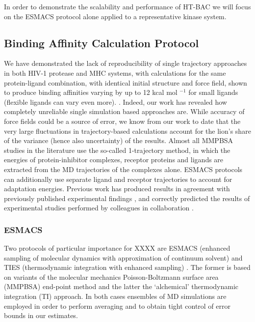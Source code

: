 In order to demonstrate the scalability and performance of HT-BAC we will focus on the ESMACS protocol alone applied to a representative kinase system.

\subsection{Binding Affinity Calculation Protocol}

We have demonstrated the lack of reproducibility of single trajectory
approaches in both HIV-1 protease and MHC systems, with calculations for the
same protein-ligand combination, with identical initial structure and force
field, shown to produce binding affinities varying by up to 12 kcal mol
$^{-1}$ for small ligands (flexible ligands can vary even more).
\cite{Wan2015, Sadiq2010, Wright2014}. Indeed, our work has revealed how
completely unreliable single simulation based approaches are. While accuracy
of force fields could be a source of error, we know from our work to date
\cite{} that the very large fluctuations in trajectory-based calculations
account for the lion’s share of the variance (hence also uncertainty) of the
results. Almost all MMPBSA studies in the literature use the so-called
1-trajectory method, in which the energies of protein-inhibitor complexes,
receptor proteins and ligands are extracted from the MD trajectories of the
complexes alone. ESMACS protocols can additionally use separate ligand and
receptor trajectories to account for adaptation energies. Previous work has
produced results in agreement with previously published experimental findings
\cite{Sadiq2010, Wan2011, Wright2014, Bhati2017, Wan2017brd4, Wan2017trk}, and
correctly predicted the results of experimental studies performed by
colleagues in collaboration \cite{Bunney2015}.


\subsubsection{ESMACS}

Two protocols of particular importance for XXXX are ESMACS (enhanced sampling
of molecular dynamics with approximation of continuum
solvent)\cite{Wan2017brd4} and TIES (thermodynamic integration with enhanced
sampling) \cite{Bhati2017}. The former is based on variants of the molecular
mechanics Poisson-Boltzmann surface area (MMPBSA) end-point method and the
latter the `alchemical' thermodynamic integration (TI) approach. In both cases
ensembles of MD simulations are employed in order to perform averaging and to
obtain tight control of error bounds in our estimates.

